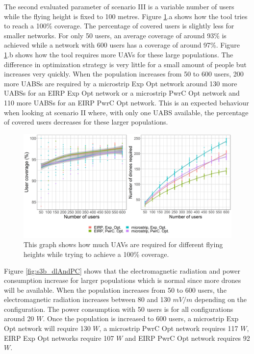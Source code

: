 The second evaluated parameter of scenario III is a variable number of users while the flying height is fixed to 100 metres.  
Figure \ref{fig:s3b_numdronesAndCov}.a shows how the tool tries to reach a 100\% coverage. The percentage
of covered users is slightly less for smaller networks. For only 50 users, an average 
coverage of around 93\% is achieved while a network with 600 users has a coverage of around 97\%.
Figure \ref{fig:s3b_numdronesAndCov}.b shows how the tool requires more \gls{UAV}s for these large 
populations. 
The difference in optimization strategy is very little for a small amount of people but increases very quickly. 
When the population increases from 50 to 600 users,
 200 more \gls{UABS}s are required by a microstrip \gls{Exp Opt} network 
 around 130 more \gls{UABS}s for an \gls{EIRP} \gls{Exp Opt} network or a microstrip \gls{PwrC Opt} network
 and 110 more \gls{UABS}s for an \gls{EIRP} \gls{PwrC Opt} network.
This is an expected behaviour  when looking at scenario II where, with only one \gls{UABS} available, 
the percentage of covered users decreases for these larger populations.
\clearpage
\begin{figure}[h]
  \includegraphics[width=\textwidth]{../results/s3/uvsnumdronesAndCov.png}
  \caption{This graph shows how much \acs{UAV}s are required for different flying heights while trying to achieve a 100\% coverage.}
  \label{fig:s3b_numdronesAndCov}
\end{figure}

Figure \ref{fig:s3b_dlAndPC} shows that the electromagnetic radiation and power consumption increase for larger 
populations which is normal since more drones will be available.
When the population increases from 50 to 600 users, the electromagnetic radiation increases 
between 80 and 130 $mV/m$ depending on the configuration. The power consumption with 50 users is for all configurations around 
20 $W$. Once the population is increased to 600 users, a microstrip \gls{Exp Opt} network will require 130 $W$, 
 a microstrip \gls{PwrC Opt} network requires 117 $W$,
\gls{EIRP} \gls{Exp Opt} networks require 107 $W$ and \gls{EIRP} \gls{PwrC Opt} network requires 92 $W$.

